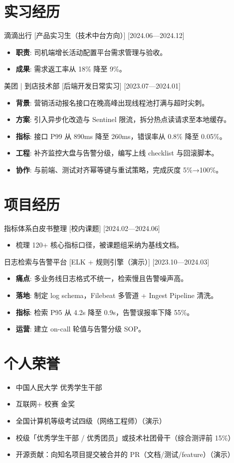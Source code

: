 \documentclass{resume-photo}
\begin{document}
\section{实习经历}
\ResumeItem
{滴滴出行}
[\textnormal{产品实习生（技术中台方向）}]
[2024.06—2024.12]

\begin{itemize}
  \item \textbf{职责}: 司机端增长活动配置平台需求管理与验收。
  \item \textbf{成果}: 需求返工率从 18\% 降至 9\%。
\end{itemize}


\ResumeItem
{美团 | 到店技术部}
[\textnormal{后端开发日常实习}]
[2023.07—2024.01]

\begin{itemize}
  \item \textbf{背景}: 营销活动报名接口在晚高峰出现线程池打满与超时尖刺。
  \item \textbf{方案}: 引入异步化改造与 Sentinel 限流，拆分热点读请求至本地缓存。
  \item \textbf{指标}: 接口 P99 从 890ms 降至 260ms，错误率从 0.8\% 降至 0.05\%。
  \item \textbf{工程}: 补齐监控大盘与告警分级，编写上线 checklist 与回滚脚本。
  \item \textbf{协作}: 与前端、测试对齐幂等键与重试策略，完成灰度 5\%→100\%。
\end{itemize}



\section{项目经历}
\ResumeItem
{指标体系白皮书整理}
[\textnormal{校内课题}]
[2024.02—2024.06]

\begin{itemize}
  \item 梳理 120+ 核心指标口径，被课题组采纳为基线文档。
\end{itemize}


\ResumeItem
{日志检索与告警平台}
[\textnormal{ELK + 规则引擎（演示）}]
[2023.10—2024.03]

\begin{itemize}
  \item \textbf{痛点}: 多业务线日志格式不统一，检索慢且告警噪声高。
  \item \textbf{落地}: 制定 log schema，Filebeat 多管道 + Ingest Pipeline 清洗。
  \item \textbf{指标}: 检索 P95 从 4.2s 降至 0.9s，告警误报率下降 55\%。
  \item \textbf{运营}: 建立 on-call 轮值与告警分级 SOP。
\end{itemize}



\section{个人荣誉}
\begin{itemize}
  \item 中国人民大学 优秀学生干部
  \item 互联网+ 校赛 金奖
  \item 全国计算机等级考试四级（网络工程师）（演示）
  \item 校级「优秀学生干部 / 优秀团员」或技术社团骨干（综合测评前 15\%）
  \item 开源贡献：向知名项目提交被合并的 PR（文档/测试/feature）（演示）
\end{itemize}
\end{document}
